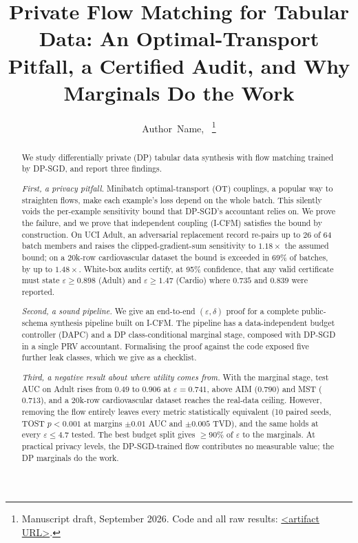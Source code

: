 \documentclass[journal]{IEEEtran}
\newcommand{\eps}{\varepsilon}
\begin{document}
\title{Private Flow Matching for Tabular Data: An Optimal-Transport Pitfall, a Certified Audit, and Why Marginals Do the Work}

\author{Author~Name,~%
\thanks{Manuscript draft, September 2026. Code and all raw results: \url{<artifact URL>}.}}

\maketitle

\begin{abstract}
We study differentially private (DP) tabular data synthesis with flow matching trained by DP-SGD, and report three findings.

\emph{First, a privacy pitfall.} Minibatch optimal-transport (OT) couplings, a popular way to straighten flows, make each example's loss depend on the whole batch. This silently voids the per-example sensitivity bound that DP-SGD's accountant relies on. We prove the failure, and we prove that independent coupling (I-CFM) satisfies the bound by construction. On UCI Adult, an adversarial replacement record re-pairs up to 26 of 64 batch members and raises the clipped-gradient-sum sensitivity to $1.18\times$ the assumed bound; on a 20k-row cardiovascular dataset the bound is exceeded in 69\% of batches, by up to $1.48\times$. White-box audits certify, at 95\% confidence, that any valid certificate must state $\eps\ge0.898$ (Adult) and $\eps\ge1.47$ (Cardio) where $0.735$ and $0.839$ were reported.

\emph{Second, a sound pipeline.} We give an end-to-end $(\eps,\delta)$ proof for a complete public-schema synthesis pipeline built on I-CFM. The pipeline has a data-independent budget controller (DAPC) and a DP class-conditional marginal stage, composed with DP-SGD in a single PRV accountant. Formalising the proof against the code exposed five further leak classes, which we give as a checklist.

\emph{Third, a negative result about where utility comes from.} With the marginal stage, test AUC on Adult rises from $0.49$ to $0.906$ at $\eps=0.741$, above AIM ($0.790$) and MST ($0.713$), and a 20k-row cardiovascular dataset reaches the real-data ceiling. However, removing the flow entirely leaves every metric statistically equivalent (10 paired seeds, TOST $p<0.001$ at margins $\pm0.01$ AUC and $\pm0.005$ TVD), and the same holds at every $\eps\le4.7$ tested. The best budget split gives $\ge90\%$ of $\eps$ to the marginals. At practical privacy levels, the DP-SGD-trained flow contributes no measurable value; the DP marginals do the work.
\end{abstract}
\end{document}
